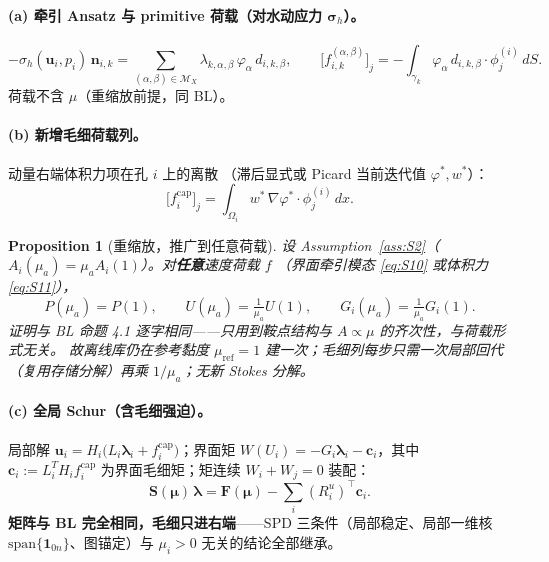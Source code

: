 \documentclass[11pt]{article}
\theoremstyle{definition}
\theoremstyle{plain}
\newtheorem{proposition}[assumption]{Proposition}
\theoremstyle{remark}
\newcommand{\vel}{\bm{u}}
\newcommand{\normal}{\bm{n}}
\newcommand{\stress}{\bm{\sigma}}
\newcommand{\iface}{\gamma}
\newcommand{\Schur}{\mathbf{S}}
\newcommand{\dd}{\,dx}
\begin{document}
\paragraph{(a) 牵引 Ansatz 与 primitive 荷载（对水动应力 $\stress_h$）。}
\begin{equation}
-\sigma_h(\vel_i,p_i)\,\normal_{i,k}
=\sum_{(\alpha,\beta)\in\mathcal M_X}\lambda_{k,\alpha,\beta}\,
\varphi_\alpha\,d_{i,k,\beta},
\qquad
\big[f_{i,k}^{(\alpha,\beta)}\big]_j
=-\int_{\iface_k}\varphi_\alpha\,d_{i,k,\beta}\cdot\phi_j^{(i)}\,dS.
\tag{S10}\label{eq:S10}
\end{equation}
荷载不含 $\mu$（重缩放前提，同 BL）。

\paragraph{(b) 新增毛细荷载列。}动量右端体积力项在孔 $i$ 上的离散
（滞后显式或 Picard 当前迭代值 $\varphi^\ast,w^\ast$）：
\begin{equation}
\big[f_i^{\mathrm{cap}}\big]_j=\int_{\Omega_i} w^\ast\,\nabla\varphi^\ast
\cdot\phi_j^{(i)}\dd.
\tag{S11}\label{eq:S11}
\end{equation}

\begin{proposition}[重缩放，推广到任意荷载]\label{prop:rescale}
设 Assumption~\ref{ass:S2}（$A_i(\mu_a)=\mu_aA_i(1)$）。对\textbf{任意}速度荷载 $f$
（界面牵引模态 \eqref{eq:S10} 或体积力 \eqref{eq:S11}），
\begin{equation}
P(\mu_a)=P(1),\qquad U(\mu_a)=\tfrac{1}{\mu_a}U(1),\qquad
G_i(\mu_a)=\tfrac{1}{\mu_a}G_i(1).
\tag{S12}\label{eq:S12}
\end{equation}
证明与 BL 命题 4.1 逐字相同——只用到鞍点结构与 $A\propto\mu$ 的齐次性，与荷载形式无关。
故离线库仍在参考黏度 $\mu_{\mathrm{ref}}=1$ 建一次；毛细列每步只需一次局部回代
（复用存储分解）再乘 $1/\mu_a$；无新 Stokes 分解。
\end{proposition}

\paragraph{(c) 全局 Schur（含毛细强迫）。}局部解
$\vel_i=H_i\big(L_i\bm\lambda_i+f_i^{\mathrm{cap}}\big)$；界面矩
$W(U_i)=-G_i\bm\lambda_i-\bm c_i$，其中 $\bm c_i:=L_i^{\!T}H_if_i^{\mathrm{cap}}$
为界面毛细矩；矩连续 $W_i+W_j=0$ 装配：
\begin{equation}
\Schur(\bm\mu)\,\bm\lambda=\mathbf F(\bm\mu)-\sum_i (R_i^u)^{\!\top}\bm c_i.
\tag{S13}\label{eq:S13}
\end{equation}
\textbf{矩阵与 BL 完全相同，毛细只进右端}——SPD 三条件（局部稳定、局部一维核
$\mathrm{span}\{\bm 1_{0n}\}$、图锚定）与 $\mu_i>0$ 无关的结论全部继承。
\end{document}
